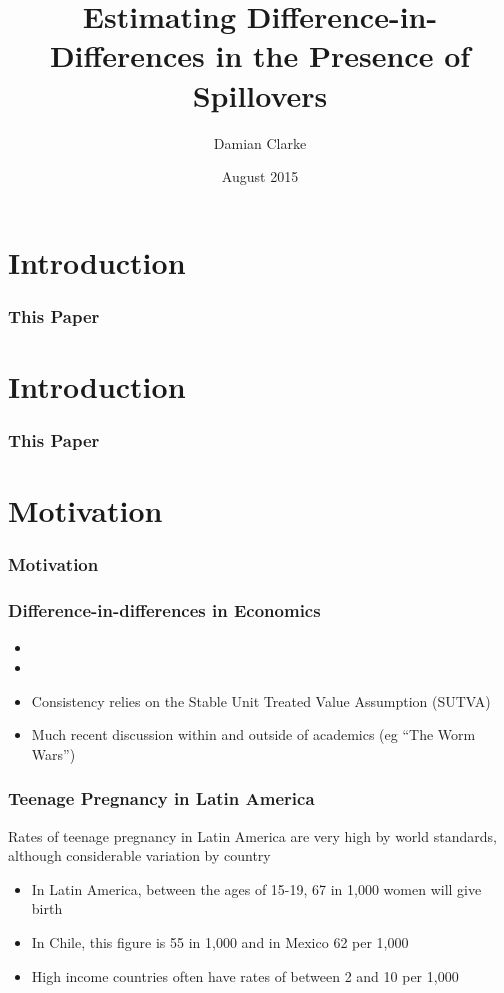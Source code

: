 \documentclass[10pt,letterpaper,subeqn]{beamer}
\title{Estimating Difference-in-Differences in the Presence of Spillovers}
\author{Damian Clarke\inst{\dag} }
\institute{\inst{\dag}  University of Oxford}
\date{August 2015}
\begin{document}
\begin{frame}
\titlepage
\end{frame}

\section{Introduction}
\begin{frame}[label=int1]
  \frametitle{This Paper}

\end{frame}

\section{Introduction}
\begin{frame}[label=int2]
  \frametitle{This Paper}

\end{frame}



\section{Motivation}
\begin{frame}[label=motivation]
  \frametitle{Motivation}

\end{frame}

\begin{frame}[label=DDM]
  \frametitle{Difference-in-differences in Economics}
\begin{itemize}
 \item 
 \item 
 \item Consistency relies on the Stable Unit Treated Value Assumption (SUTVA)
 \item Much recent discussion within and outside of academics (eg ``The Worm Wars'')
\end{itemize}
\end{frame}

\begin{frame}[label=teenPreg]
  \frametitle{Teenage Pregnancy in Latin America}
Rates of teenage pregnancy in Latin America are very high by world standards, 
although considerable variation by country
\vspace{4mm}
\begin{itemize}
\item In Latin America, between the ages of 15-19, 67 in 1,000 women will give birth
\item In Chile, this figure is 55 in 1,000 and in Mexico 62 per 1,000
\item High income countries often have rates of between 2 and 10 per 1,000
\end{itemize}
\end{frame}
\end{document}
